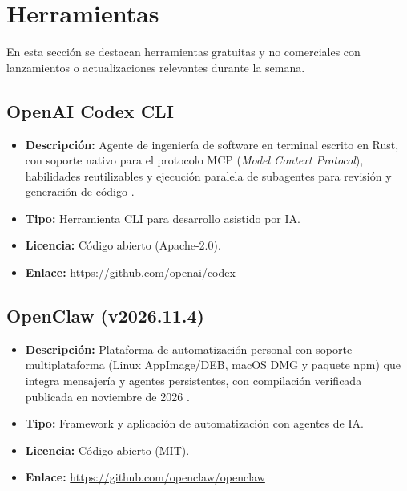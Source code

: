 \documentclass[conference,twocolumn,spanish]{IEEEtran}
\begin{document}
\section{Herramientas}

En esta sección se destacan herramientas gratuitas y no comerciales con lanzamientos o actualizaciones relevantes durante la semana.

\subsection{OpenAI Codex CLI}
\begin{itemize}
    \item \textbf{Descripción:} Agente de ingeniería de software en terminal escrito en Rust, con soporte nativo para el protocolo MCP (\textit{Model Context Protocol}), habilidades reutilizables y ejecución paralela de subagentes para revisión y generación de código \cite{datacamp_harnesses_2026}.
    \item \textbf{Tipo:} Herramienta CLI para desarrollo asistido por IA.
    \item \textbf{Licencia:} Código abierto (Apache-2.0).
    \item \textbf{Enlace:} \url{https://github.com/openai/codex}
\end{itemize}

\subsection{OpenClaw (v2026.11.4)}
\begin{itemize}
    \item \textbf{Descripción:} Plataforma de automatización personal con soporte multiplataforma (Linux AppImage/DEB, macOS DMG y paquete npm) que integra mensajería y agentes persistentes, con compilación verificada publicada en noviembre de 2026 \cite{openclaw_releases_2026}.
    \item \textbf{Tipo:} Framework y aplicación de automatización con agentes de IA.
    \item \textbf{Licencia:} Código abierto (MIT).
    \item \textbf{Enlace:} \url{https://github.com/openclaw/openclaw}
\end{itemize}
\end{document}
